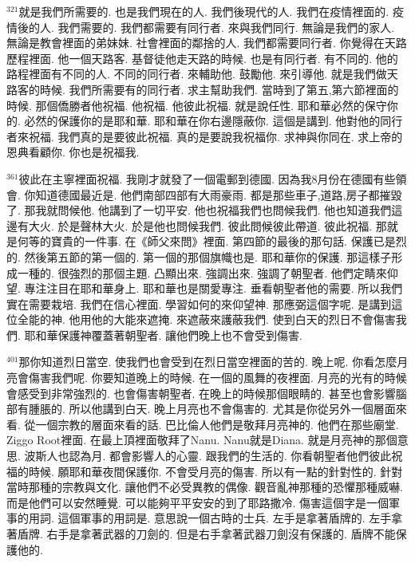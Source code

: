\documentclass{book}
\begin{document}
$^{321}$就是我們所需要的.
也是我們現在的人.
我們後現代的人.
我們在疫情裡面的.
疫情後的人.
我們需要的.
我們都需要有同行者.
來與我們同行.
無論是我們的家人.
無論是教會裡面的弟妹妹.
社會裡面的鄰捨的人.
我們都需要同行者.
你覺得在天路歷程裡面.
他一個天路客.
基督徒他走天路的時候.
也是有同行者.
有不同的.
他的路程裡面有不同的人.
不同的同行者.
來輔助他.
鼓勵他.
來引導他.
就是我們做天路客的時候.
我們所需要有的同行者.
求主幫助我們.
當時到了第五,第六節裡面的時候.
那個僑勝者他祝福.
他祝福.
他彼此祝福.
就是說任性.
耶和華必然的保守你的.
必然的保護你的是耶和華.
耶和華在你右邊隱蔽你.
這個是講到.
他對他的同行者來祝福.
我們真的是要彼此祝福.
真的是要說我祝福你.
求神與你同在.
求上帝的恩典看顧你.
你也是祝福我.

$^{361}$彼此在主寧裡面祝福.
我剛才就發了一個電郵到德國.
因為我8月份在德國有些領會.
你知道德國最近是.
他們南部四部有大雨豪雨.
都是那些車子,道路,房子都摧毀了.
那我就問候他.
他講到了一切平安.
他也祝福我們也問候我們.
他也知道我們這邊有大火.
於是聲林大火.
於是他也問候我們.
彼此問候彼此帶道.
彼此祝福.
那就是何等的寶貴的一件事.
在《師父來問》裡面.
第四節的最後的那句話.
保護已是烈的.
然後第五節的第一個的.
第一個的那個旗幟也是.
耶和華你的保護.
那這樣子形成一種的.
很強烈的那個主題.
凸顯出來.
強調出來.
強調了朝聖者.
他們定睛來仰望.
專注注目在耶和華身上.
耶和華也是關愛專注.
垂看朝聖者他的需要.
所以我們實在需要栽培.
我們在信心裡面.
學習如何的來仰望神.
那應弼這個字呢.
是講到這位全能的神.
他用他的大能來遮掩.
來遮蔽來護蔽我們.
使到白天的烈日不會傷害我們.
耶和華保護神覆蓋著朝聖者.
讓他們晚上也不會受到傷害.

$^{401}$那你知道烈日當空.
使我們也會受到在烈日當空裡面的苦的.
晚上呢.
你看怎麼月亮會傷害我們呢.
你要知道晚上的時候.
在一個的風舞的夜裡面.
月亮的光有的時候會感受到非常強烈的.
也會傷害朝聖者.
在晚上的時候那個眼睛的.
甚至也會影響腦部有腫脹的.
所以他講到白天.
晚上月亮也不會傷害的.
尤其是你從另外一個層面來看.
從一個宗教的層面來看的話.
巴比倫人他們是敬拜月亮神的.
他們在那些廟堂.
Ziggo Root裡面.
在最上頂裡面敬拜了Nanu.
Nanu就是Diana.
就是月亮神的那個意思.
波斯人也認為月.
都會影響人的心靈.
跟我們的生活的.
你看朝聖者他們彼此祝福的時候.
願耶和華夜間保護你.
不會受月亮的傷害.
所以有一點的針對性的.
針對當時那種的宗教與文化.
讓他們不必受異教的偶像.
觀音亂神那種的恐懼那種威嚇.
而是他們可以安然睡覺.
可以能夠平平安安的到了耶路撒冷.
傷害這個字是一個軍事的用詞.
這個軍事的用詞是.
意思說一個古時的士兵.
左手是拿著盾牌的.
左手拿著盾牌.
右手是拿著武器的刀劍的.
但是右手拿著武器刀劍沒有保護的.
盾牌不能保護他的.
\end{document}
